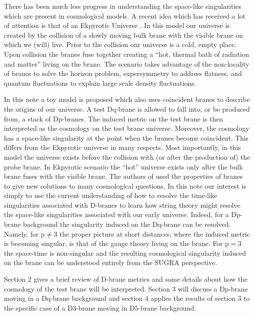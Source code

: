 \documentclass[a4paper,12pt]{article}
\begin{document}
There has been much less progress in understanding the space-like
singularities which are present in cosmological models.  A recent idea
which has received a lot of attention is that of an Ekpyrotic Universe 
\cite{ekpy}.  In this model our universe is created by the
collision of a slowly moving bulk brane with the visible brane on which we
(will) live.   Prior to the collision our universe is a cold, empty
place.  Upon collision the branes fuse together creating a ``hot,
thermal bath of radiation and matter'' living on the brane.  The
scenario takes advantage of the non-locality of branes to solve the
horizon problem, supersymmetry to address flatness, and quantum
fluctuations to explain large scale density fluctuations.

In this note a toy model is proposed which also uses coincident branes
to describe the origins of our universe.  A test Dq-brane is allowed to fall
into, or be produced from, a stack of Dp-branes.  The induced metric
on the test brane is then interpreted as the cosmology on the test brane
universe.  Moreover, the cosmology has a space-like singularity at the
point when the branes become coincident.  This differs from the
Ekpyrotic universe in many respects.  Most importantly, in this model the
universe exists before the collision with (or after the production of)
the probe brane.  In Ekpyrotic scenario the ``hot'' universe 
exists only after the bulk brane fuses with the visible brane.  The authors
of \cite{ekpy} used the properties of branes to give new solutions to
many cosmological questions.  In this note our interest is simply to use the
current understanding of how to resolve the time-like singularities associated
with D-branes to learn how string theory might resolve the space-like 
singularities associated with our early universe.  Indeed,  
for a Dp-brane background the singularity induced on the
Dq-brane can be resolved.  Namely, for $\mbox{p} \ne 3$ the proper
picture at short distances, where the induced metric is becoming singular,
is that of the gauge theory living on the brane.  For $\mbox{p}=3$ the
space-time is non-singular and the resulting cosmological singularity
induced on the brane can be understood entirely from the SUGRA perspective.

Section 2 gives a brief review of D-brane metrics and some details
about how the cosmology of the test brane will be interpreted.
Section 3 will discuss a Dp-brane moving in a Dq-brane
background and section 4 applies the results of section 3 to the
specific case of a D3-brane moving in D5-brane background.
\end{document}
